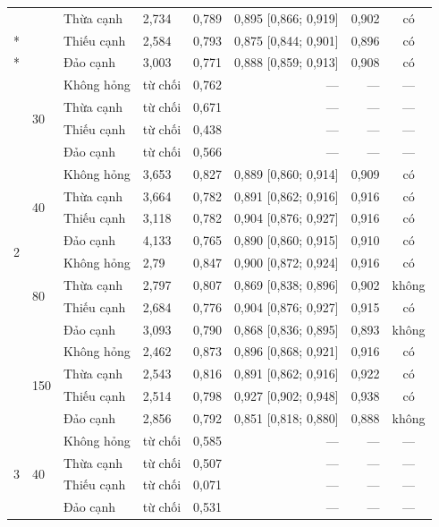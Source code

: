 {\begin{longtable}{llllrrrc}
 &  & Thừa cạnh & 2,734 & 0,789 & 0,895 [0,866; 0,919] & 0,902 & có \\*
 &  & Thiếu cạnh & 2,584 & 0,793 & 0,875 [0,844; 0,901] & 0,896 & có \\*
 &  & Đảo cạnh & 3,003 & 0,771 & 0,888 [0,859; 0,913] & 0,908 & có \\
\midrule
\multirow{16}{*}{2} & \multirow{4}{*}{30} & Không hỏng & từ chối & 0,762 & --- & --- & --- \\*
 &  & Thừa cạnh & từ chối & 0,671 & --- & --- & --- \\*
 &  & Thiếu cạnh & từ chối & 0,438 & --- & --- & --- \\*
 &  & Đảo cạnh & từ chối & 0,566 & --- & --- & --- \\
\cmidrule(l){2-8}
 & \multirow{4}{*}{40} & Không hỏng & 3,653 & 0,827 & 0,889 [0,860; 0,914] & 0,909 & có \\*
 &  & Thừa cạnh & 3,664 & 0,782 & 0,891 [0,862; 0,916] & 0,916 & có \\*
 &  & Thiếu cạnh & 3,118 & 0,782 & 0,904 [0,876; 0,927] & 0,916 & có \\*
 &  & Đảo cạnh & 4,133 & 0,765 & 0,890 [0,860; 0,915] & 0,910 & có \\
\cmidrule(l){2-8}
 & \multirow{4}{*}{80} & Không hỏng & 2,79 & 0,847 & 0,900 [0,872; 0,924] & 0,916 & có \\*
 &  & Thừa cạnh & 2,797 & 0,807 & 0,869 [0,838; 0,896] & 0,902 & không \\*
 &  & Thiếu cạnh & 2,684 & 0,776 & 0,904 [0,876; 0,927] & 0,915 & có \\*
 &  & Đảo cạnh & 3,093 & 0,790 & 0,868 [0,836; 0,895] & 0,893 & không \\
\cmidrule(l){2-8}
 & \multirow{4}{*}{150} & Không hỏng & 2,462 & 0,873 & 0,896 [0,868; 0,921] & 0,916 & có \\*
 &  & Thừa cạnh & 2,543 & 0,816 & 0,891 [0,862; 0,916] & 0,922 & có \\*
 &  & Thiếu cạnh & 2,514 & 0,798 & 0,927 [0,902; 0,948] & 0,938 & có \\*
 &  & Đảo cạnh & 2,856 & 0,792 & 0,851 [0,818; 0,880] & 0,888 & không \\
\midrule
\multirow{12}{*}{3} & \multirow{4}{*}{40} & Không hỏng & từ chối & 0,585 & --- & --- & --- \\*
 &  & Thừa cạnh & từ chối & 0,507 & --- & --- & --- \\*
 &  & Thiếu cạnh & từ chối & 0,071 & --- & --- & --- \\*
 &  & Đảo cạnh & từ chối & 0,531 & --- & --- & --- \\

\end{longtable}}
